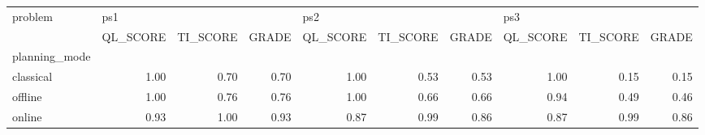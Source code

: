 \begin{tabular}{lrrrrrrrrr}
\toprule
problem & \multicolumn{3}{l}{ps1} & \multicolumn{3}{l}{ps2} & \multicolumn{3}{l}{ps3} \\
{} & QL\_SCORE & TI\_SCORE & GRADE & QL\_SCORE & TI\_SCORE & GRADE & QL\_SCORE & TI\_SCORE & GRADE \\
planning\_mode &          &          &       &          &          &       &          &          &       \\
\midrule
classical     &     1.00 &     0.70 &  0.70 &     1.00 &     0.53 &  0.53 &     1.00 &     0.15 &  0.15 \\
offline       &     1.00 &     0.76 &  0.76 &     1.00 &     0.66 &  0.66 &     0.94 &     0.49 &  0.46 \\
online        &     0.93 &     1.00 &  0.93 &     0.87 &     0.99 &  0.86 &     0.87 &     0.99 &  0.86 \\
\bottomrule
\end{tabular}
